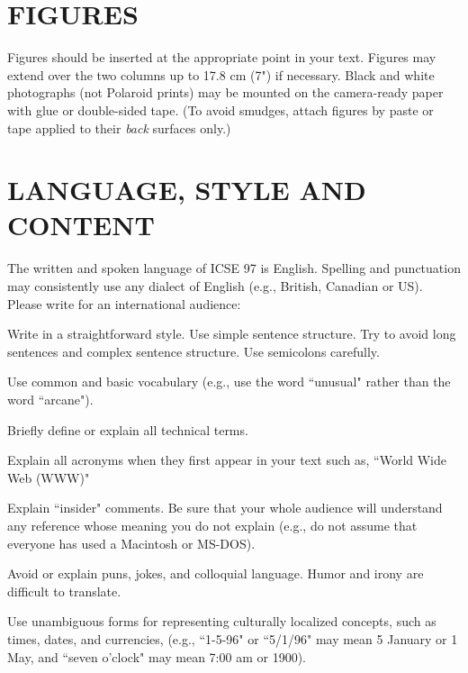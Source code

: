 \section{FIGURES}
Figures should be inserted at the appropriate point in your 
text. Figures may extend over the two columns up to 17.8 
cm (7") if necessary. Black and white photographs (not 
Polaroid prints) may be mounted on the camera-ready paper 
with glue or double-sided tape. (To avoid smudges, attach 
figures by paste or tape applied to their {\it back} surfaces only.)

\section{LANGUAGE, STYLE AND CONTENT}
The written and spoken language of ICSE 97 is English. 
Spelling and punctuation may consistently use any dialect 
of English (e.g., British, Canadian or US). Please write for 
an international audience:
 
\begin{smallitem}
\item Write in a straightforward style. Use simple sentence 
structure. Try to avoid long sentences and complex sentence 
structure. Use semicolons carefully.
 
\item Use common and basic vocabulary (e.g., use the word 
``unusual" rather than the word ``arcane").
 
\item Briefly define or explain all technical terms.
 
\item Explain all acronyms when they first appear in your text 
such as, ``World Wide Web (WWW)"
 
\item Explain ``insider" comments. Be sure that your whole 
audience will understand any reference whose meaning 
you do not explain (e.g., do not assume that everyone 
has used a Macintosh or MS-DOS).
 
\item Avoid or explain puns, jokes, and colloquial language. 
Humor and irony are difficult to translate. 
 
\item Use unambiguous forms for representing culturally 
localized concepts, such as times, dates, and currencies, 
(e.g., ``1-5-96" or ``5/1/96" may mean 5 January or 1 
May, and ``seven o'clock" may mean 7:00 am or 1900).
\end{smallitem}
 
